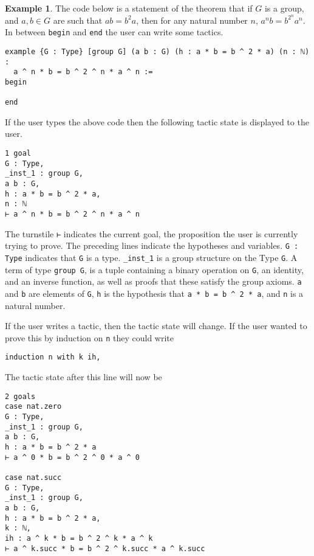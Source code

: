 \documentclass[12pt]{article} %
\theoremstyle{definition}
\theoremstyle{definition}
\theoremstyle{definition}
\theoremstyle{definition}
\newtheorem{exmpl}[thm]{Example}
\begin{document}
\begin{exmpl}

The code below is a statement of the theorem that if $G$ is a group, and
$a, b ∈ G$ are such that $ab = b^2a$, then for any natural number $n$,
$a^nb = b^{2^n}a^n$. In between \lstinline{begin} and \lstinline{end} the user
can write some tactics.

\begin{lstlisting}
example {G : Type} [group G] (a b : G) (h : a * b = b ^ 2 * a) (n : ℕ) :
  a ^ n * b = b ^ 2 ^ n * a ^ n :=
begin

end
\end{lstlisting}

If the user types the above code then the following tactic state is displayed to the user.

\begin{lstlisting}
1 goal
G : Type,
_inst_1 : group G,
a b : G,
h : a * b = b ^ 2 * a,
n : ℕ
⊢ a ^ n * b = b ^ 2 ^ n * a ^ n
\end{lstlisting}

The turnstile \lstinline{⊢} indicates the current goal, the proposition the user
is currently trying to prove. The preceding lines indicate the hypotheses and variables.
\lstinline{G : Type} indicates that \lstinline{G} is a type.
\lstinline{_inst_1} is a group structure on the Type \lstinline{G}.
A term of type \lstinline{group G}, is a tuple containing a binary operation on
\lstinline{G}, an identity, and an inverse function, as well as proofs that these
satisfy the group axioms. \lstinline{a} and \lstinline{b} are elements of
\lstinline{G}, \lstinline{h} is the hypothesis that \lstinline{a * b = b ^ 2 * a},
and \lstinline{n} is a natural number.

If the user writes a tactic, then the tactic state will change. If the user
wanted to prove this by induction on \lstinline{n} they could write

\begin{lstlisting}
induction n with k ih,
\end{lstlisting}

The tactic state after this line will now be

\begin{lstlisting}
2 goals
case nat.zero
G : Type,
_inst_1 : group G,
a b : G,
h : a * b = b ^ 2 * a
⊢ a ^ 0 * b = b ^ 2 ^ 0 * a ^ 0

case nat.succ
G : Type,
_inst_1 : group G,
a b : G,
h : a * b = b ^ 2 * a,
k : ℕ,
ih : a ^ k * b = b ^ 2 ^ k * a ^ k
⊢ a ^ k.succ * b = b ^ 2 ^ k.succ * a ^ k.succ
\end{lstlisting}


\end{exmpl}
\end{document}
